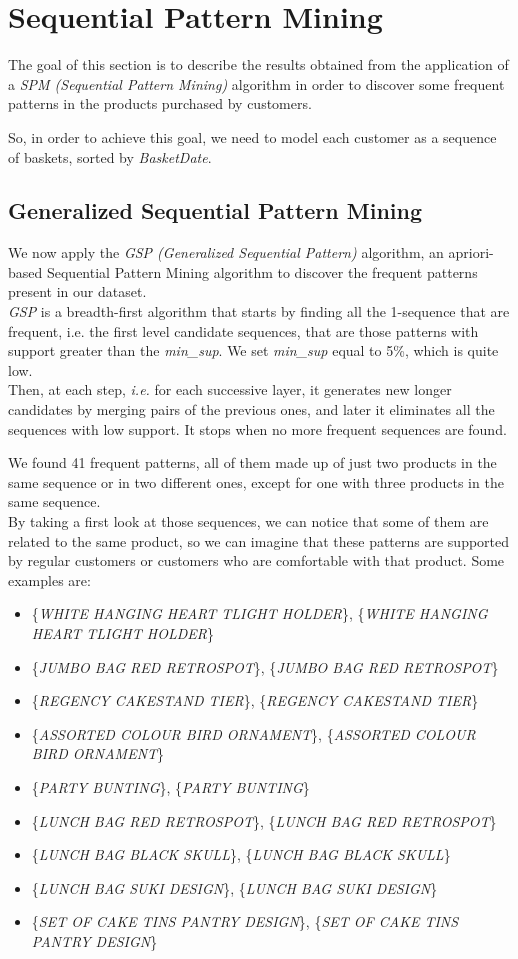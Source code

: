 \section{Sequential Pattern Mining}
The goal of this section is to describe the results obtained from the application of a \emph{SPM (Sequential Pattern Mining)} algorithm in order to discover some frequent patterns in the products purchased by customers.

So, in order to achieve this goal, we need to model each customer as a sequence of baskets, sorted by \emph{BasketDate}.

\subsection{Generalized Sequential Pattern Mining}
We now apply the \emph{GSP (Generalized Sequential Pattern)} algorithm, an apriori-based Sequential Pattern Mining algorithm to discover the frequent patterns present in our dataset.\\
\emph{GSP} is a breadth-first algorithm that starts by finding all the 1-sequence that are frequent, i.e. the first level candidate sequences, that are those patterns with support greater than the \emph{min\_sup}. We set \emph{min\_sup} equal to 5\%, which is quite low.\\
Then, at each step, \emph{i.e.} for each successive layer, it generates new longer candidates by merging pairs of the previous ones, and later it eliminates all the sequences with low support. It stops when no more frequent sequences are found.

We found 41 frequent patterns, all of them made up of just two products in the same sequence or in two different ones, except for one with three products in the same sequence.\\
By taking a first look at those sequences, we can notice that some of them are related to the same product, so we can imagine that these patterns are supported by regular customers or customers who are comfortable with that product. Some examples are:

\begin{itemize}
\item \{\emph{WHITE HANGING HEART TLIGHT HOLDER}\}, \{\emph{WHITE HANGING HEART TLIGHT HOLDER}\}
\item \{\emph{JUMBO BAG RED RETROSPOT}\}, \{\emph{JUMBO BAG RED RETROSPOT}\}
\item \{\emph{REGENCY CAKESTAND TIER}\}, \{\emph{REGENCY CAKESTAND TIER}\}
\item \{\emph{ASSORTED COLOUR BIRD ORNAMENT}\}, \{\emph{ASSORTED COLOUR BIRD ORNAMENT}\}
\item \{\emph{PARTY BUNTING}\}, \{\emph{PARTY BUNTING}\}
\item \{\emph{LUNCH BAG RED RETROSPOT}\}, \{\emph{LUNCH BAG RED RETROSPOT}\}
\item \{\emph{LUNCH BAG BLACK SKULL}\}, \{\emph{LUNCH BAG BLACK SKULL}\}
\item \{\emph{LUNCH BAG SUKI DESIGN}\}, \{\emph{LUNCH BAG SUKI DESIGN}\}
\item \{\emph{SET OF CAKE TINS PANTRY DESIGN}\}, \{\emph{SET OF CAKE TINS PANTRY DESIGN}\}
\end{itemize}

